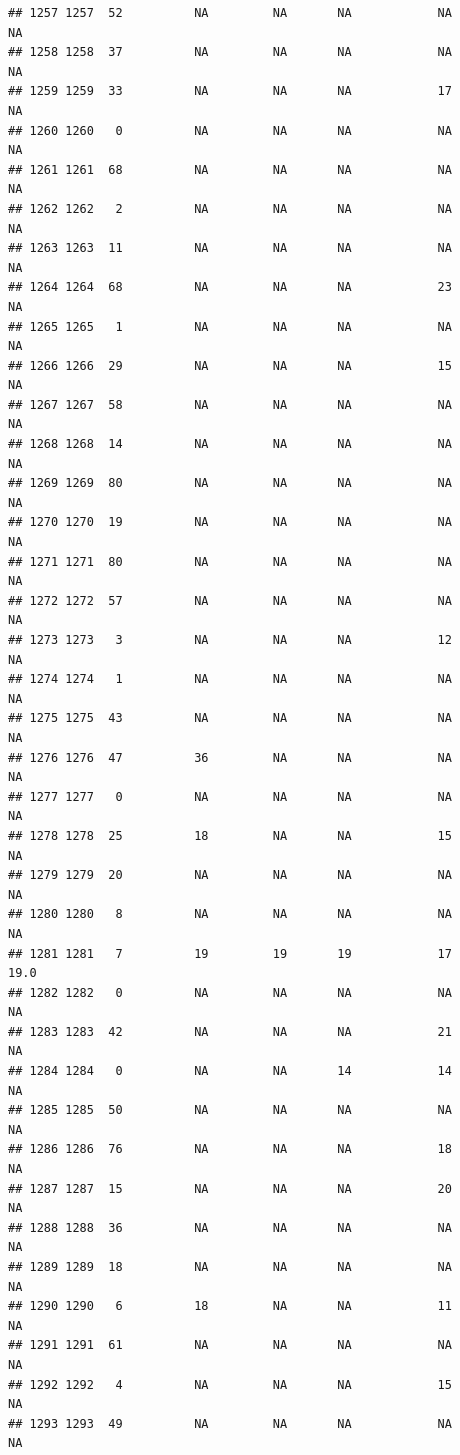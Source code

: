 \documentclass[man]{apa6}
\begin{document}
\begin{verbatim}
## 1257 1257  52          NA         NA       NA            NA       NA
## 1258 1258  37          NA         NA       NA            NA       NA
## 1259 1259  33          NA         NA       NA            17       NA
## 1260 1260   0          NA         NA       NA            NA       NA
## 1261 1261  68          NA         NA       NA            NA       NA
## 1262 1262   2          NA         NA       NA            NA       NA
## 1263 1263  11          NA         NA       NA            NA       NA
## 1264 1264  68          NA         NA       NA            23       NA
## 1265 1265   1          NA         NA       NA            NA       NA
## 1266 1266  29          NA         NA       NA            15       NA
## 1267 1267  58          NA         NA       NA            NA       NA
## 1268 1268  14          NA         NA       NA            NA       NA
## 1269 1269  80          NA         NA       NA            NA       NA
## 1270 1270  19          NA         NA       NA            NA       NA
## 1271 1271  80          NA         NA       NA            NA       NA
## 1272 1272  57          NA         NA       NA            NA       NA
## 1273 1273   3          NA         NA       NA            12       NA
## 1274 1274   1          NA         NA       NA            NA       NA
## 1275 1275  43          NA         NA       NA            NA       NA
## 1276 1276  47          36         NA       NA            NA       NA
## 1277 1277   0          NA         NA       NA            NA       NA
## 1278 1278  25          18         NA       NA            15       NA
## 1279 1279  20          NA         NA       NA            NA       NA
## 1280 1280   8          NA         NA       NA            NA       NA
## 1281 1281   7          19         19       19            17     19.0
## 1282 1282   0          NA         NA       NA            NA       NA
## 1283 1283  42          NA         NA       NA            21       NA
## 1284 1284   0          NA         NA       14            14       NA
## 1285 1285  50          NA         NA       NA            NA       NA
## 1286 1286  76          NA         NA       NA            18       NA
## 1287 1287  15          NA         NA       NA            20       NA
## 1288 1288  36          NA         NA       NA            NA       NA
## 1289 1289  18          NA         NA       NA            NA       NA
## 1290 1290   6          18         NA       NA            11       NA
## 1291 1291  61          NA         NA       NA            NA       NA
## 1292 1292   4          NA         NA       NA            15       NA
## 1293 1293  49          NA         NA       NA            NA       NA

\end{verbatim}
\end{document}
